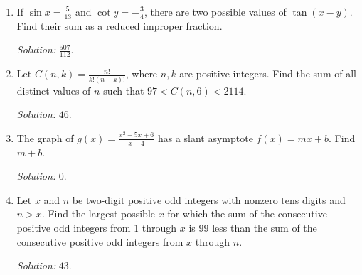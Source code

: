 \documentclass[11pt]{article}
\begin{document}
\begin{enumerate}[label=\textbf{\arabic*.}]
\item If $\sin x=\frac5{13}$ and $\cot y=-\frac34$, there are two possible values of $\tan(x-y)$. Find their sum as a reduced improper fraction.\par\textit{Solution: }$\frac{507}{112}$.

\item Let $C(n,k)=\frac{n!}{k!(n-k)!}$, where $n,k$ are positive integers. Find the sum of all distinct values of $n$ such that $97<C(n,6)<2114$.\par\textit{Solution: }$46$.

\item The graph of $g(x)=\frac{x^2-5x+6}{x-4}$ has a slant asymptote $f(x)=mx+b$. Find $m+b$.\par\textit{Solution: }$0$.

\item Let $x$ and $n$ be two-digit positive odd integers with nonzero tens digits and $n>x$. Find the largest possible $x$ for which the sum of the consecutive positive odd integers from 1 through $x$ is 99 less than the sum of the consecutive positive odd integers from $x$ through $n$.\par\textit{Solution: }$43$.
\end{enumerate}
\end{document}
